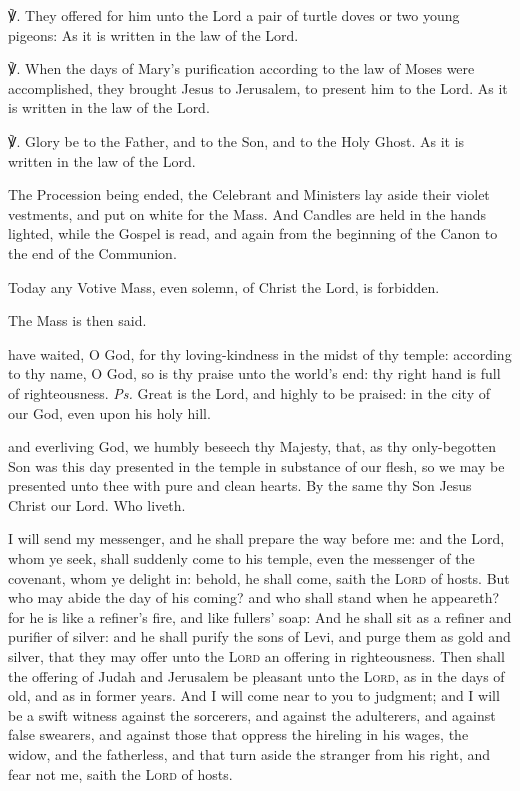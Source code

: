 ℣. They offered for him unto the Lord a pair of turtle doves or two young pigeons: As it is written in the law of the Lord.

℣. When the days of Mary's purification according to the law of Moses were accomplished, they brought Jesus to Jerusalem, to present him to the Lord. As it is written in the law of the Lord.

℣. Glory be to the Father, and to the Son, and to the Holy Ghost. As it is written in the law of the Lord.

\begin{rubric}
    The Procession being ended, the Celebrant and Ministers lay aside their violet vestments, and put on white for the Mass. And Candles are held in the hands lighted, while the Gospel is read, and again from the beginning of the Canon to the end of the Communion.
\end{rubric}

\begin{rubric}
    Today any Votive Mass, even solemn, of Christ the Lord, is forbidden.
\end{rubric}
\begin{rubric}
    The Mass is then said.
\end{rubric}
\introit
{} have waited, O God, for thy loving-kindness in the midst of thy temple: according to thy name, O God, so is thy praise unto the world's end: thy right hand is full of righteousness. \textit{Ps.} Great is the Lord, and highly to be praised: in the city of our God, even upon his holy hill.

\collect
{} and everliving God, we humbly beseech thy Majesty, that, as thy only-begotten Son was this day presented in the temple in substance of our flesh, so we may be presented unto thee with pure and clean hearts. By the same thy Son Jesus Christ our Lord. Who liveth.

 I will send my messenger, and he shall prepare the way before me: and the Lord, whom ye seek, shall suddenly come to his temple, even the messenger of the covenant, whom ye delight in: behold, he shall come, saith the \textsc{Lord} of hosts. But who may abide the day of his coming? and who shall stand when he appeareth? for he is like a refiner's fire, and like fullers' soap: And he shall sit as a refiner and purifier of silver: and he shall purify the sons of Levi, and purge them as gold and silver, that they may offer unto the \textsc{Lord} an offering in righteousness. Then shall the offering of Judah and Jerusalem be pleasant unto the \textsc{Lord}, as in the days of old, and as in former years. And I will come near to you to judgment; and I will be a swift witness against the sorcerers, and against the adulterers, and against false swearers, and against those that oppress the hireling in his wages, the widow, and the fatherless, and that turn aside the stranger from his right, and fear not me, saith the \textsc{Lord} of hosts.

